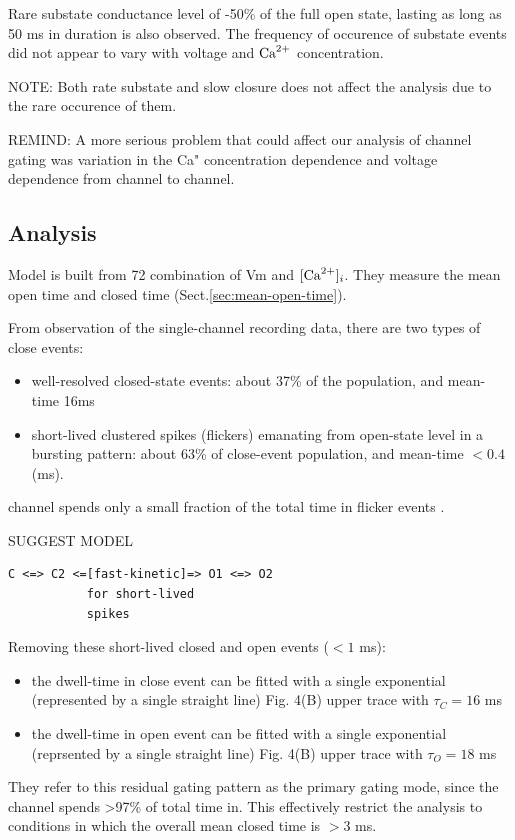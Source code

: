 Rare substate conductance level of -50\% of the full open state, lasting as
long as 50 ms in duration is also observed. The frequency of occurence of
substate events did not appear to vary with voltage and ${\text{Ca}^{2+}}$ concentration.

NOTE: Both rate substate and slow closure does not affect the analysis due to
the rare occurence of them.

REMIND: A more serious problem that could affect our analysis of channel gating
was variation in the Ca" concentration dependence and voltage dependence from
channel to channel.

\subsection{Analysis}

Model is built from 72 combination of Vm and $[{\text{Ca}^{2+}}]_i$.
They measure the mean open time and closed time (Sect.\ref{sec:mean-open-time}).

From observation of the single-channel recording data, there are two types of
close events:
\begin{itemize}
  \item well-resolved closed-state events: about 37\% of the population, and
  mean-time 16ms
  
  \item short-lived clustered spikes (flickers) emanating from open-state
  level in a bursting pattern: about 63\% of close-event population, and
  mean-time $< 0.4$ (ms).
\end{itemize}
channel spends only a small fraction of the
total time in flicker events .

SUGGEST MODEL
\begin{verbatim}
C <=> C2 <=[fast-kinetic]=> O1 <=> O2
           for short-lived
           spikes
\end{verbatim}


Removing these short-lived closed and open events ($< 1$ ms): 
\begin{itemize}
  
  \item the dwell-time in close event can be fitted with a single exponential
  (represented by a single straight line) Fig. 4(B) upper trace with $\tau_C=16$ ms
  
  \item the dwell-time in open event can be fitted with a single exponential
  (reprsented by a single straight line) Fig. 4(B) upper trace with $\tau_O =18$
  ms 
\end{itemize}
They refer to this residual gating pattern as the primary gating mode, since the
channel spends >97\% of total time in.
This effectively restrict the analysis to conditions in which the
overall mean closed time is $>3$ ms.


